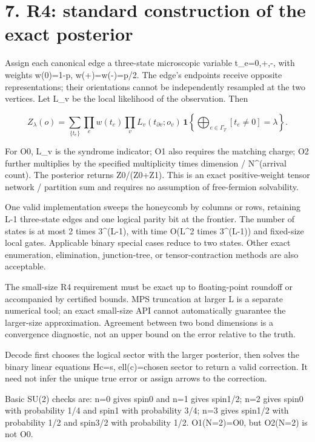 \documentclass[11pt,a4paper]{article}
\begin{document}
\section*{7. R4: standard construction of the exact posterior}

Assign each canonical edge a three-state microscopic variable t\_e=0,+,-, with weights w(0)=1-p, w(+)=w(-)=p/\allowbreak{}2. The edge's endpoints receive opposite representations; their orientations cannot be independently resampled at the two vertices. Let L\_v be the local likelihood of the observation. Then

\[
Z_\lambda(o)=\sum_{\{t_e\}}
\prod_e w(t_e)\prod_v L_v(t_{\partial v};o_v)
\,\mathbf1\!\left\{\bigoplus_{e\in\Gamma_T}[t_e\ne0]=\lambda\right\}.
\]

For O0, L\_v is the syndrome indicator; O1 also requires the matching charge; O2 further multiplies by the specified multiplicity times dimension /\allowbreak{} N\textasciicircum{}(arrival count). The posterior returns Z0/\allowbreak{}(Z0+Z1). This is an exact positive-weight tensor network /\allowbreak{} partition sum and requires no assumption of free-fermion solvability.

One valid implementation sweeps the honeycomb by columns or rows, retaining L-1 three-state edges and one logical parity bit at the frontier. The number of states is at most 2 times 3\textasciicircum{}(L-1), with time O(L\textasciicircum{}2 times 3\textasciicircum{}(L-1)) and fixed-size local gates. Applicable binary special cases reduce to two states. Other exact enumeration, elimination, junction-tree, or tensor-contraction methods are also acceptable.

The small-size R4 requirement must be exact up to floating-point roundoff or accompanied by certified bounds. MPS truncation at larger L is a separate numerical tool; an exact small-size API cannot automatically guarantee the larger-size approximation. Agreement between two bond dimensions is a convergence diagnostic, not an upper bound on the error relative to the truth.

Decode first chooses the logical sector with the larger posterior, then solves the binary linear equations Hc=s, ell(c)=chosen sector to return a valid correction. It need not infer the unique true error or assign arrows to the correction.

Basic SU(2) checks are: n=0 gives spin0 and n=1 gives spin1/\allowbreak{}2; n=2 gives spin0 with probability 1/\allowbreak{}4 and spin1 with probability 3/\allowbreak{}4; n=3 gives spin1/\allowbreak{}2 with probability 1/\allowbreak{}2 and spin3/\allowbreak{}2 with probability 1/\allowbreak{}2. O1(N=2)=O0, but O2(N=2) is not O0.
\end{document}
